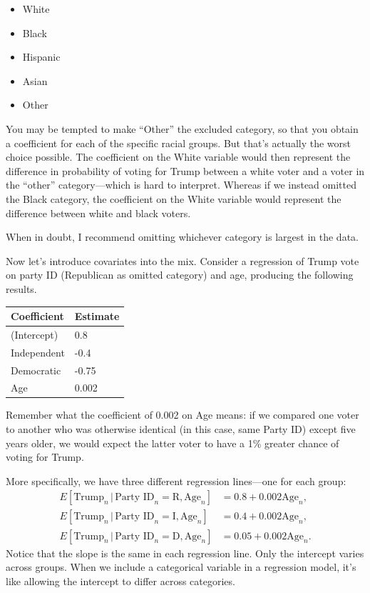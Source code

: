 \documentclass[12pt,oneside,openany]{book}
\providecommand{\tightlist}{%
  \setlength{\itemsep}{0pt}\setlength{\parskip}{0pt}}
\begin{document}
\begin{itemize}
\tightlist
\item
  White
\item
  Black
\item
  Hispanic
\item
  Asian
\item
  Other
\end{itemize}

You may be tempted to make ``Other'' the excluded category, so that you
obtain a coefficient for each of the specific racial groups. But that's
actually the worst choice possible. The coefficient on the White
variable would then represent the difference in probability of voting
for Trump between a white voter and a voter in the ``other''
category---which is hard to interpret. Whereas if we instead omitted the
Black category, the coefficient on the White variable would represent
the difference between white and black voters.

When in doubt, I recommend omitting whichever category is largest in the
data.

Now let's introduce covariates into the mix. Consider a regression of
Trump vote on party ID (Republican as omitted category) and age,
producing the following results.

\begin{longtable}[]{@{}ll@{}}
\toprule
Coefficient & Estimate\tabularnewline
\midrule
\endhead
(Intercept) & 0.8\tabularnewline
Independent & -0.4\tabularnewline
Democratic & -0.75\tabularnewline
Age & 0.002\tabularnewline
\bottomrule
\end{longtable}

Remember what the coefficient of 0.002 on Age means: if we compared one
voter to another who was otherwise identical (in this case, same Party
ID) except five years older, we would expect the latter voter to have a
1\% greater chance of voting for Trump.

More specifically, we have three different regression lines---one for
each group: \[
\begin{aligned}
  E[\text{Trump}_n \,|\, \text{Party ID}_n = \text{R}, \text{Age}_n] &= 0.8 + 0.002 \text{Age}_n, \\
  E[\text{Trump}_n \,|\, \text{Party ID}_n = \text{I}, \text{Age}_n] &= 0.4 + 0.002 \text{Age}_n, \\
  E[\text{Trump}_n \,|\, \text{Party ID}_n = \text{D}, \text{Age}_n] &= 0.05 + 0.002 \text{Age}_n.
\end{aligned}
\] Notice that the slope is the same in each regression line. Only the
intercept varies across groups. When we include a categorical variable
in a regression model, it's like allowing the intercept to differ across
categories.
\end{document}
